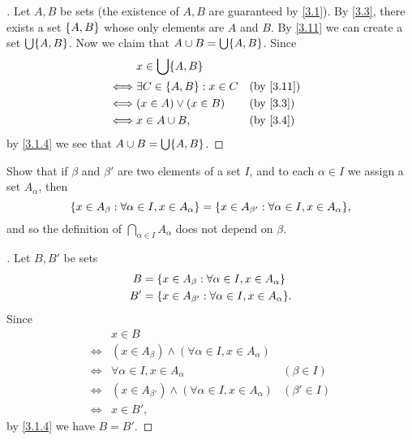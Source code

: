 \begin{proof}[]
  Let \(A, B\) be sets (the existence of \(A, B\) are guaranteed by \cref{3.1}).
  By \cref{3.3}, there exists a set \(\left\lbrace A, B\right\rbrace\) whose only elements are \(A\) and \(B\).
  By \cref{3.11} we can create a set \(\bigcup \set{A, B}\).
  Now we claim that \(A \cup B = \bigcup \set{A, B}\).
  Since
  \begin{align*}
         & x \in \bigcup \set{A, B}                          \\
    \iff & \exists C \in \set{A, B} : x \in C &  & \by{3.11} \\
    \iff & (x \in A) \lor (x \in B)           &  & \by{3.3}  \\
    \iff & x \in A \cup B,                    &  & \by{3.4}
  \end{align*}
  by \cref{3.1.4} we see that \(A \cup B = \bigcup \set{A, B}\).
\end{proof}

\begin{ex}\label{ex:3.4.9}
  Show that if \(\beta\) and \(\beta'\) are two elements of a set \(I\), and to each \(\alpha \in I\) we assign a set \(A_\alpha\), then
  \[
    \set{x \in A_\beta : \forall \alpha \in I, x \in A_\alpha} = \set{x \in A_{\beta'} : \forall \alpha \in I, x \in A_\alpha},
  \]
  and so the definition of \(\bigcap_{\alpha \in I} A_\alpha\) does not depend on \(\beta\).
\end{ex}

\begin{proof}[]
  Let \(B, B'\) be sets
  \begin{align*}
    B  & = \set{x \in A_\beta : \forall \alpha \in I, x \in A_\alpha}     \\
    B' & = \set{x \in A_{\beta'} : \forall \alpha \in I, x \in A_\alpha}.
  \end{align*}
  Since
  \begin{align*}
         & x \in B                                                                          \\
    \iff & (x \in A_\beta) \land (\forall \alpha \in I, x \in A_\alpha)                     \\
    \iff & \forall \alpha \in I, x \in A_\alpha                            & (\beta \in I)  \\
    \iff & (x \in A_{\beta'}) \land (\forall \alpha \in I, x \in A_\alpha) & (\beta' \in I) \\
    \iff & x \in B',
  \end{align*}
  by \cref{3.1.4} we have \(B = B'\).
\end{proof}

